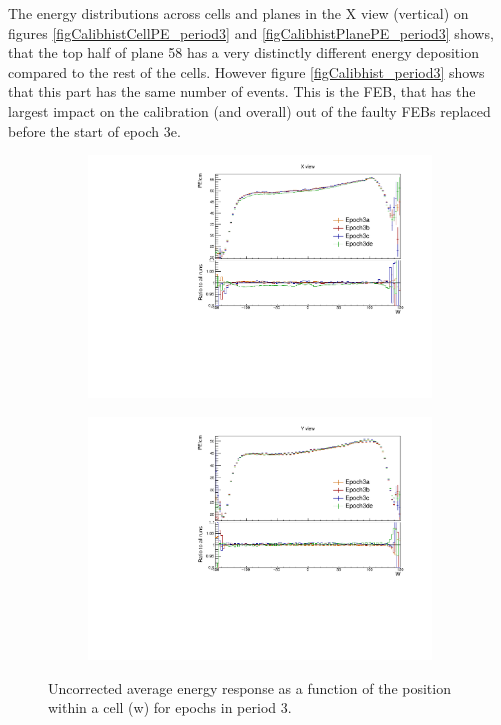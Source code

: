\documentclass[12pt,a4paper]{article}
\begin{document}
The energy distributions across cells and planes in the X view (vertical) on figures \ref{figCalibhistCellPE_period3} and \ref{figCalibhistPlanePE_period3} shows, that the top half of plane 58 has a very distinctly different energy deposition compared to the rest of the cells. However figure \ref{figCalibhist_period3} shows that this part has the same number of events. This is the FEB, that has the largest impact on the calibration (and overall) out of the faulty FEBs replaced before the start of epoch 3e.

\begin{figure}[!hbtp]
\centering
\begin{subfigure}[b]{0.495\textwidth}
\centering
\includegraphics[width=\textwidth]{Plots/Attenprofs_P3Data_WPE_corr_xy_X_Combined.pdf}
\end{subfigure}
\begin{subfigure}[b]{0.495\textwidth}
\centering
\includegraphics[width=\textwidth]{Plots/Attenprofs_P3Data_WPE_corr_xy_Y_Combined.pdf}
\end{subfigure}
\caption{Uncorrected average energy response as a function of the position within a cell (w) for epochs in period 3.}
\label{figCalibhistWPE_period3}
\end{figure}
\end{document}
